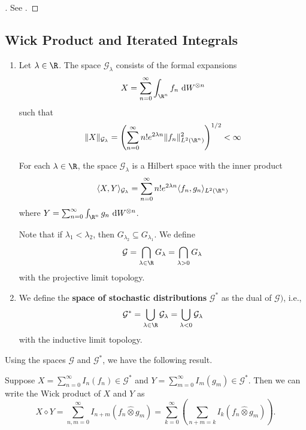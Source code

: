 \begin{proof}[]
	See \cite{holden1996stochastic}.
\end{proof}

\subsection*{Wick Product and Iterated Integrals}

\begin{definition}
	\begin{enumerate}
		\item Let $\lambda \in \R$. The space $\mathcal{G}_\lambda$ consists of the formal expansions 
			\[ X = \sum_{n=0}^\infty \int_{\R^n} f_n ~\mathrm{d}W^{\otimes n} \] such that \[ \| X \|_{\mathcal{G}_\lambda} = \left( \sum_{n=0}^\infty n! e^{2 \lambda n} \| f_n \|_{L^2(\R^n)}^2 \right)^{1/2} < \infty \]

			For each $\lambda \in \R$, the space $\mathcal{G}_\lambda$ is a Hilbert space with the inner product 
			\[ \langle X, Y \rangle_{\mathcal{G}_\lambda} = \sum_{n=0}^\infty n! e^{2 \lambda n} \langle f_n, g_n \rangle_{L^2(\R^n)} \]
			where $Y = \sum_{n=0}^\infty \int_{\R^n} g_n ~\mathrm{d}W^{\otimes n}$.

			Note that if $\lambda_1 < \lambda_2$, then $G_{\lambda_2} \subseteq G_{\lambda_1}$. We define 
			\[ \mathcal{G} = \bigcap_{\lambda \in \R} G_\lambda = \bigcap_{\lambda > 0} G_\lambda \] with the projective limit topology. 

		\item We define the \textbf{space of stochastic distributions} $\mathcal{G}^\ast$ as the dual of $\mathcal{G})$, i.e.,
			\[ \mathcal{G}^\ast = \bigcup_{\lambda \in \R} \mathcal{G}_\lambda = \bigcup_{\lambda < 0} \mathcal{G}_\lambda \] with the inductive limit topology.
	\end{enumerate}
\end{definition}

Using the spaces $\mathcal{G}$ and $\mathcal{G}^\ast$, we have the following result.

\begin{theorem}
Suppose $X=\sum_{n=0}^{\infty} I_n(f_n) \in \mathcal{G}^*$ and $Y=\sum_{m=0}^{\infty} I_m(g_m) \in \mathcal{G}^*$.
Then we can write the Wick product of $X$ and $Y$ as
$$
X \diamond Y=\sum_{n, m=0}^{\infty} I_{n+m}(f_n \widehat{\otimes} g_m)=\sum_{k=0}^{\infty}\left(\sum_{n+m=k} I_k(f_n \widehat{\otimes} g_m)\right) .
$$
\end{theorem}

